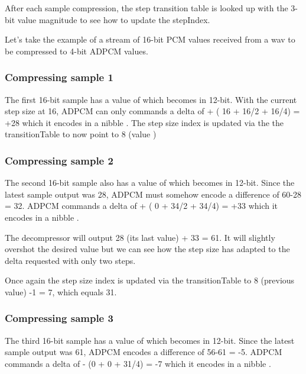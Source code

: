  

After each sample compression, the step transition table is looked up with the 3-bit value magnitude to see how to update the stepIndex.

 

Let's take the example of a stream of 16-bit PCM values received from a wav to be compressed to 4-bit ADPCM values.



\subsubsection{Compressing sample 1}
The first 16-bit sample has a value of  which becomes  in 12-bit. With the current step size at 16, ADPCM can only commands a delta of + ( 16 + 16/2 + 16/4) = +28 which it encodes in a nibble . The step size index is updated via the the transitionTable to now point to 8 (value )

\subsubsection{Compressing sample 2}
The second 16-bit sample also has a value of  which becomes  in 12-bit. Since the latest sample output was 28, ADPCM must somehow encode a difference of 60-28 = 32. ADPCM commands a delta of + ( 0 + 34/2 + 34/4) = +33 which it encodes in a nibble . 

The decompressor will output 28 (its last value) + 33 = 61. It will slightly overshot the desired value but we can see how the step size has adapted to the delta requested with only two steps. 

Once again the step size index is updated via the transitionTable to 8 (previous value) -1 = 7, which equals 31.

\subsubsection{Compressing sample 3}
The third 16-bit sample has a value of  which becomes  in 12-bit. Since the latest sample output was 61, ADPCM encodes a difference of 56-61 = -5. ADPCM commands a delta of - (0 + 0 + 31/4) = -7 which it encodes in a nibble . 

